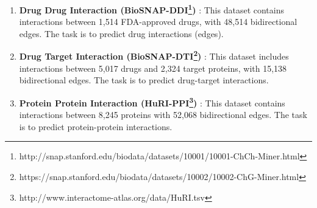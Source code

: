 \begin{enumerate}
\begin{enumerate}
\item \label{data:ddi}\textbf{Drug Drug Interaction (BioSNAP-DDI\footnote{http://snap.stanford.edu/biodata/datasets/10001/10001-ChCh-Miner.html})} \cite{zitnikbiosnap}: This dataset contains interactions between 1,514 FDA-approved drugs, with 48,514 bidirectional edges. The task is to predict drug interactions (edges).

\item \label{data:dti}\textbf{Drug Target Interaction (BioSNAP-DTI\footnote{https://snap.stanford.edu/biodata/datasets/10002/10002-ChG-Miner.html})} \cite{zitnikbiosnap}: This dataset includes interactions between 5,017 drugs and 2,324 target proteins, with 15,138 bidirectional edges. The task is to predict drug-target interactions.

\item \label{data:ppi}\textbf{Protein Protein Interaction (HuRI-PPI\footnote{http://www.interactome-atlas.org/data/HuRI.tsv})} \cite{luck2020reference}: This dataset contains interactions between 8,245 proteins with 52,068 bidirectional edges. The task is to predict protein-protein interactions.
\end{enumerate}








\end{enumerate}
